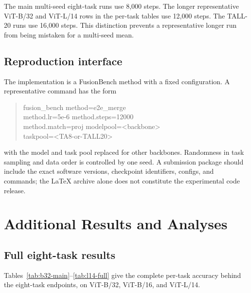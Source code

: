 \documentclass[letterpaper]{article} %
\theoremstyle{plain}
\theoremstyle{definition}
\begin{document}
The main multi-seed eight-task runs use 8,000 steps.
The longer representative ViT-B/32 and ViT-L/14 rows in the per-task tables use 12,000 steps.
The TALL-20 runs use 16,000 steps.
This distinction prevents a representative longer run from being mistaken for a multi-seed mean.

\subsection{Reproduction interface}
The implementation is a FusionBench method with a fixed configuration.
A representative command has the form
\begin{quote}\footnotesize\ttfamily\raggedright
fusion\_bench method=e2e\_merge\\ method.lr=5e-6 method.steps=12000\\ method.match=proj modelpool=<backbone>\\ taskpool=<TA8-or-TALL20>
\end{quote}
with the model and task pool replaced for other backbones.
Randomness in task sampling and data order is controlled by one seed.
A submission package should include the exact software versions, checkpoint identifiers, configs, and commands; the LaTeX archive alone does not constitute the experimental code release.
\section{Additional Results and Analyses}
\label{app:additional-results}

\subsection{Full eight-task results}
\label{app:full-results}
Tables~\ref{tab:b32-main}--\ref{tab:l14-full} give the complete per-task accuracy behind the eight-task endpoints, on ViT-B/32, ViT-B/16, and ViT-L/14.
\end{document}
